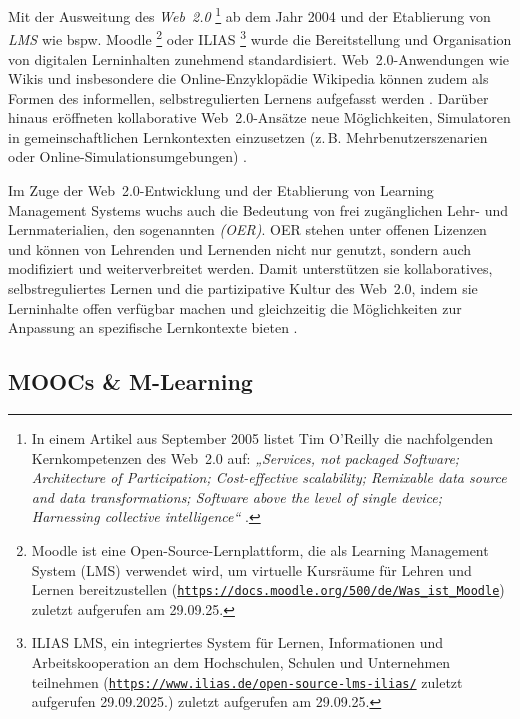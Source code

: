 Mit der Ausweitung des \textit{Web~2.0} \footnote{In einem Artikel aus September 2005 listet Tim O'Reilly die nachfolgenden Kernkompetenzen des Web~2.0 auf: \textit{„Services, not packaged Software; Architecture of Participation; Cost-effective scalability; Remixable data source and data transformations; Software above the level of single device; Harnessing collective intelligence“} \cite{oreilly_what_2005}.} ab dem Jahr 2004 und der Etablierung von \textit{\ac{LMS}} wie bspw. Moodle \footnote{Moodle ist eine Open-Source-Lernplattform, die als Learning Management System (LMS) verwendet wird, um virtuelle Kursräume für Lehren und Lernen bereitzustellen (\href{https://docs.moodle.org/500/de/Was_ist_Moodle}{\nolinkurl{https://docs.moodle.org/500/de/Was_ist_Moodle}}) zuletzt aufgerufen am 29.09.25.} oder ILIAS \footnote{ILIAS \ac{LMS}, ein integriertes System für Lernen, Informationen und Arbeitskooperation an dem Hochschulen, Schulen und Unternehmen teilnehmen (\href{https://www.ilias.de/open-source-lms-ilias/}{\nolinkurl{https://www.ilias.de/open-source-lms-ilias/}} zuletzt aufgerufen 29.09.2025.) zuletzt aufgerufen am 29.09.25.} wurde die Bereitstellung und Organisation von digitalen Lerninhalten zunehmend standardisiert. Web~2.0-Anwendungen wie Wikis und insbesondere die Online-Enzyklopädie Wikipedia können zudem als Formen des informellen, selbstregulierten Lernens aufgefasst werden \parencite[S.~14]{niegemann_kompendium_2008}. Darüber hinaus eröffneten kollaborative Web~2.0-Ansätze neue Möglichkeiten, Simulatoren in gemeinschaftlichen Lernkontexten einzusetzen (z.\,B. Mehrbenutzerszenarien oder Online-Simulationsumgebungen) \parencite[S.~129f]{gallagher_assessing_2007}.

Im Zuge der Web~2.0-Entwicklung und der Etablierung von Learning Management Systems wuchs auch die Bedeutung von frei zugänglichen Lehr- und Lernmaterialien, den sogenannten \textit{(\ac{OER})}. \ac{OER} stehen unter offenen Lizenzen und können von Lehrenden und Lernenden nicht nur genutzt, sondern auch modifiziert und weiterverbreitet werden. Damit unterstützen sie kollaboratives, selbstreguliertes Lernen und die partizipative Kultur des Web~2.0, indem sie Lerninhalte offen verfügbar machen und gleichzeitig die Möglichkeiten zur Anpassung an spezifische Lernkontexte bieten \parencites[S.~1]{unesco_guidelines_2011}[S.~194f]{fluhler_open_2024}.

\subsection{MOOCs \& M-Learning}


